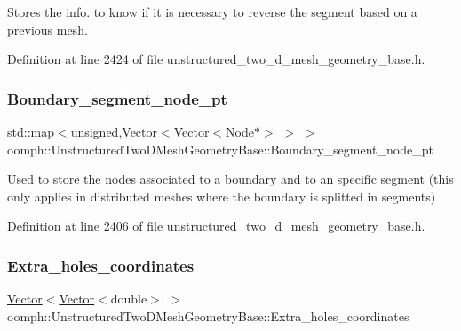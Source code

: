 Stores the info. to know if it is necessary to reverse the segment based on a previous mesh. 



Definition at line 2424 of file unstructured\+\_\+two\+\_\+d\+\_\+mesh\+\_\+geometry\+\_\+base.\+h.

\mbox{\label{classoomph_1_1UnstructuredTwoDMeshGeometryBase_ad32540548b45899b632136726d85721c}} 
\subsubsection{\texorpdfstring{Boundary\+\_\+segment\+\_\+node\+\_\+pt}{Boundary\_segment\_node\_pt}}
{\footnotesize\ttfamily std\+::map$<$unsigned,\hyperlink{classoomph_1_1Vector}{Vector}$<$\hyperlink{classoomph_1_1Vector}{Vector}$<$\hyperlink{classoomph_1_1Node}{Node}$\ast$$>$ $>$ $>$ oomph\+::\+Unstructured\+Two\+D\+Mesh\+Geometry\+Base\+::\+Boundary\+\_\+segment\+\_\+node\+\_\+pt\hspace{0.3cm}{\ttfamily [protected]}}



Used to store the nodes associated to a boundary and to an specific segment (this only applies in distributed meshes where the boundary is splitted in segments) 



Definition at line 2406 of file unstructured\+\_\+two\+\_\+d\+\_\+mesh\+\_\+geometry\+\_\+base.\+h.

\mbox{\label{classoomph_1_1UnstructuredTwoDMeshGeometryBase_a75f6839c28d529b43ada0bd94df8b79f}} 
\subsubsection{\texorpdfstring{Extra\+\_\+holes\+\_\+coordinates}{Extra\_holes\_coordinates}}
{\footnotesize\ttfamily \hyperlink{classoomph_1_1Vector}{Vector}$<$\hyperlink{classoomph_1_1Vector}{Vector}$<$double$>$ $>$ oomph\+::\+Unstructured\+Two\+D\+Mesh\+Geometry\+Base\+::\+Extra\+\_\+holes\+\_\+coordinates\hspace{0.3cm}{\ttfamily [protected]}}



